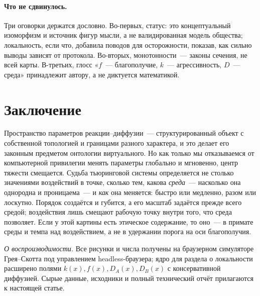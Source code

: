 \documentclass[11pt]{article}
\makeatletter
\newcommand{\rule@line}{{\color{acmag!40}\hrule height 0.7pt}}
\newcommand{\DA}{D_{\!A}}\newcommand{\DB}{D_{\!B}}
\makeatother
\begin{document}
\paragraph{Что не сдвинулось.} Три оговорки держатся дословно. Во-первых, статус: это концептуальный изоморфизм
и источник фигур мысли, а не валидированная модель общества; локальность, если что, добавила поводов для
осторожности, показав, как сильно выводы зависят от протокола. Во-вторых, монотонности~— законы сечения, не всей
карты. В-третьих, глосс «$f$~— благополучие, $k$~— агрессивность, $D$~— среда» принадлежит автору, а не диктуется
математикой.

\section{Заключение}
Пространство параметров реакции–диффузии~— структурированный объект с собственной топологией и границами разного
характера, и это делает его законным предметом онтологии виртуального. Но как только мы отказываемся от
компьютерной привилегии менять параметры глобально и мгновенно, центр тяжести смещается. Судьба тьюринговой
системы определяется не столько значениями воздействий в точке, сколько тем, какова \emph{среда}~— насколько она
однородна и проницаема~— и \emph{как} она меняется: быстро или медленно, разом или лоскутно. Порядок создаётся и
губится, а его масштаб задаётся прежде всего средой; воздействия лишь смещают рабочую точку внутри того, что
среда позволяет. Если у этой картины есть этическое содержание, то оно~— в примате среды и темпа над воздействием,
а не в удержании порога на оси благополучия.

\vspace{2mm}\noindent\rule@line
\footnotesize\color{acgrey}
\emph{О воспроизводимости.} Все рисунки и числа получены на браузерном симуляторе Грея–Скотта под управлением
headless-браузера; ядро для раздела о локальности расширено полями $k(x),f(x),\DA(x),\DB(x)$ с консервативной
диффузией. Сырые данные, исходники и полный технический отчёт прилагаются к настоящей статье.
\normalsize\color{acink}
\end{document}
